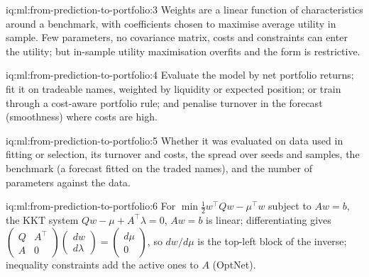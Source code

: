 \begin{solution}{iq:ml:from-prediction-to-portfolio:3}
Weights are a linear function of characteristics around a benchmark, with coefficients chosen to maximise average utility in
sample. Few parameters, no covariance matrix, costs and constraints can enter the utility; but in-sample utility maximisation
overfits and the  form is restrictive.
\end{solution}

\begin{solution}{iq:ml:from-prediction-to-portfolio:4}
Evaluate the model by net portfolio returns; fit it on tradeable names, weighted by liquidity or expected position; or train
through a cost-aware portfolio rule; and penalise turnover in the forecast (smoothness) where costs are high.
\end{solution}

\begin{solution}{iq:ml:from-prediction-to-portfolio:5}
Whether it was evaluated on data used in fitting or selection, its turnover and costs, the spread over seeds and samples, the
benchmark (a forecast fitted on the traded names), and the number of parameters against the data.
\end{solution}

\begin{solution}{iq:ml:from-prediction-to-portfolio:6}
For $\min\frac12w^\top Qw - \mu^\top w$ subject to $Aw = b$, the KKT system $Qw - \mu + A^\top\lambda = 0$, $Aw = b$ is linear;
differentiating gives $\begin{pmatrix}Q & A^\top\\ A & 0\end{pmatrix}\begin{pmatrix}dw\\ d\lambda\end{pmatrix} =
\begin{pmatrix}d\mu\\ 0\end{pmatrix}$, so $dw/d\mu$ is the top-left block of the inverse; inequality constraints add the active
ones to $A$ (OptNet).
\end{solution}
